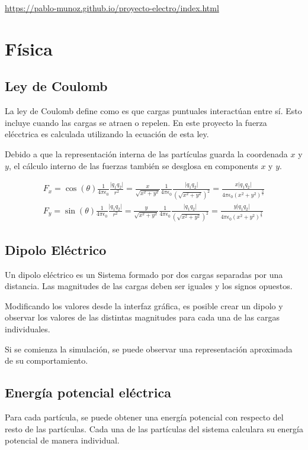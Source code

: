\documentclass[11pt]{article}
\begin{document}
\url{https://pablo-munoz.github.io/proyecto-electro/index.html}

\section{Física}
\label{sec-7}
\subsection{Ley de Coulomb}
\label{sec-7-1}
La ley de Coulomb define como es que cargas puntuales interactúan
entre sí. Esto incluye cuando las cargas se atraen o repelen. En este
proyecto la fuerza elécctrica es calculada utilizando la ecuación de
esta ley.

Debido a que la representación interna de las partículas guarda la
coordenada $x$ y $y$, el cálculo interno de las fuerzas también se
desglosa en components $x$ y $y$.

\begin{align*}
  F_x = \cos ( \theta ) \frac{1}{4 \pi \epsilon_0} \frac{\vert q_1 q_2 \vert}{r^2} =
  \frac{x}{\sqrt{x^2 + y^2}} \frac{1}{4 \pi \epsilon_0} \frac{\vert q_1 q_2 \vert}{ (\sqrt{x^2 + y^2 })^2 } =
  \frac{x \vert q_1 q_2 \vert }{4 \pi \epsilon_0 (x^2 + y^2)^{\frac{3}{2}}} \\
  F_y = \sin ( \theta ) \frac{1}{4 \pi \epsilon_0} \frac{\vert q_1 q_2 \vert}{r^2} =
  \frac{y}{\sqrt{x^2 + y^2}} \frac{1}{4 \pi \epsilon_0} \frac{\vert q_1 q_2 \vert}{ (\sqrt{x^2 + y^2 })^2 } =
  \frac{y \vert q_1 q_2 \vert }{4 \pi \epsilon_0 (x^2 + y^2)^{\frac{3}{2}}}
\end{align*}

\subsection{Dipolo Eléctrico}
\label{sec-7-2}
Un dipolo eléctrico es un Sistema formado por dos cargas separadas por
una distancia. Las magnitudes de las cargas deben ser iguales y los
signos opuestos.

Modificando los valores desde la interfaz gráfica, es posible crear un
dipolo y observar los valores de las distintas magnitudes para cada
una de las cargas individuales. 

Si se comienza la simulación, se puede observar una representación
aproximada de su comportamiento.

\subsection{Energía potencial eléctrica}
\label{sec-7-3}
Para cada partícula, se puede obtener una energía potencial con
respecto del resto de las partículas. Cada una de las partículas del
sistema calculara su energía potencial de manera individual. 
\end{document}
